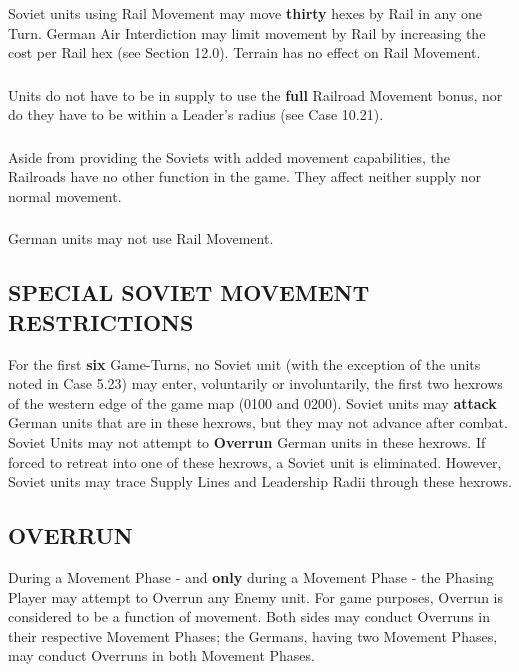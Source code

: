 \subsubsection{} Soviet units using Rail Movement may move \textbf{thirty} hexes by Rail in any one Turn. German Air Interdiction may limit movement by Rail by increasing the cost per Rail hex (see Section 12.0). Terrain has no effect on Rail Movement.

\subsubsection{} Units do not have to be in supply to use the \textbf{full} Railroad Movement bonus, nor do they have to be within a Leader's radius (see Case 10.21).

\subsubsection{} Aside from providing the Soviets with added movement capabilities, the Railroads have no other function in the game. They affect neither supply nor normal movement.

\subsubsection{} German units may not use Rail Movement.

\subsection{SPECIAL SOVIET MOVEMENT RESTRICTIONS}

For the first \textbf{six} Game-Turns, no Soviet unit (with the exception of the units noted in Case 5.23) may enter, voluntarily or involuntarily, the first two hexrows of the western edge of the game map (0100 and 0200). Soviet units may \textbf{attack} German units that are in these hexrows, but they may not advance after combat. Soviet Units may not attempt to \textbf{Overrun} German units in these hexrows. If forced to retreat into one of these hexrows, a Soviet unit is eliminated. However, Soviet units may trace Supply Lines and Leadership Radii through these hexrows.

\subsection{OVERRUN}

During a Movement Phase - and \textbf{only} during a Movement Phase - the Phasing Player may attempt to Overrun any Enemy unit. For game purposes, Overrun is considered to be a function of movement. Both sides may conduct Overruns in their respective Movement Phases; the Germans, having two Movement Phases, may conduct Overruns in both Movement Phases.

